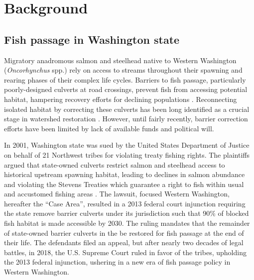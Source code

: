 \documentclass[12pt]{elsarticle}
\begin{document}
%
\section{Background}

\subsection*{Fish passage in Washington state}



Migratory anadromous salmon and steelhead native to Western Washington (\textit{Oncorhynchus} spp.) rely on access to streams throughout their spawning and rearing phases of their complex life cycles. Barriers to fish passage, particularly poorly-designed culverts at road crossings, prevent fish from accessing potential habitat, hampering recovery efforts for declining populations \citep{noauthor_2020_2020}. Reconnecting isolated habitat by correcting these culverts has been long identified as a crucial stage in watershed restoration \citep{roni_review_2002}. However, until fairly recently, barrier correction efforts have been limited by lack of available funds and political will. 


In 2001, Washington state was sued by the United States Department of Justice on behalf of 21 Northwest tribes for violating treaty fishing rights. The plaintiffs argued that state-owned culverts restrict salmon and steelhead access to historical upstream spawning habitat, leading to declines in salmon abundance and violating the Stevens Treaties which guarantee a right to fish within usual and accustomed fishing areas \citep{hickey_highway_2018}. The lawsuit, focused Western Washington, hereafter the ``Case Area'', resulted in a 2013 federal court injunction requiring the state remove barrier culverts under its jurisdiction such that 90\% of blocked fish habitat is made accessible by 2030. The ruling mandates that the remainder of state-owned barrier culverts in the be restored for fish passage at the end of their life. The defendants filed an appeal, but after nearly two decades of legal battles, in 2018, the U.S. Supreme Court ruled in favor of the tribes, upholding the 2013 federal injunction, ushering in a new era of fish passage policy in Western Washington. 
\end{document}
